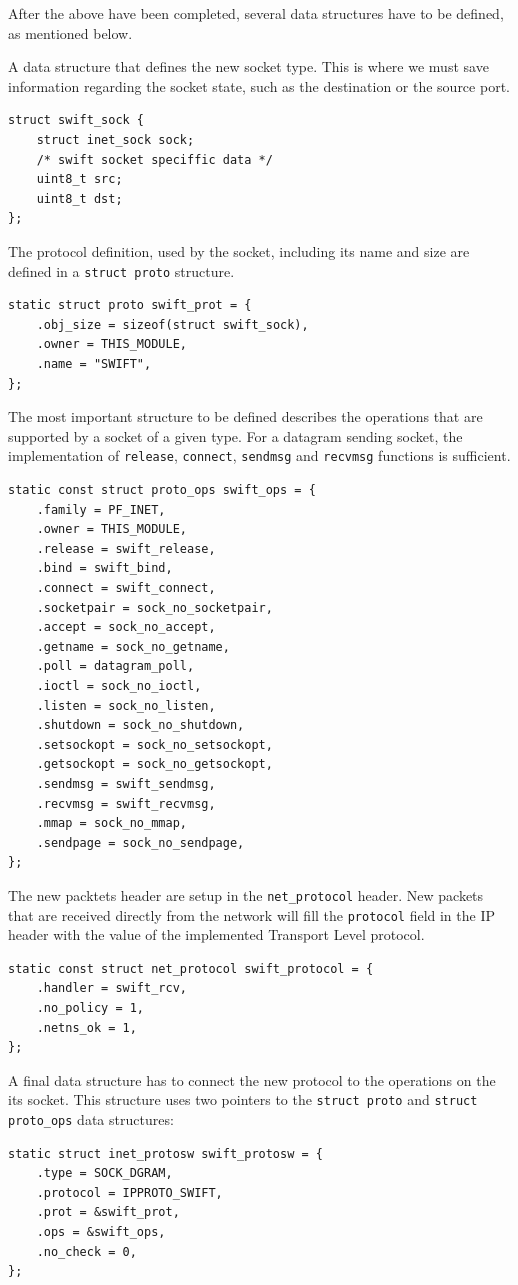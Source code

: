 After the above have been completed, several data structures have to be
defined, as mentioned below.

A data structure that defines the new socket type. This is where we must save
information regarding the socket state, such as the destination or the source
port.
\begin{verbatim}
struct swift_sock {
    struct inet_sock sock;
    /* swift socket speciffic data */
    uint8_t src;
    uint8_t dst;
};
\end{verbatim}

The protocol definition, used by the socket, including its name and size are
defined in a \texttt{struct proto} structure.
\begin{verbatim}
static struct proto swift_prot = {
    .obj_size = sizeof(struct swift_sock),
    .owner = THIS_MODULE,
    .name = "SWIFT",
};
\end{verbatim}

The most important structure to be defined describes the operations that are
supported by a socket of a given type. For a datagram sending socket, the
implementation of \texttt{release}, \texttt{connect}, \texttt{sendmsg} and
\texttt{recvmsg} functions is sufficient.
\begin{verbatim}
static const struct proto_ops swift_ops = {
    .family = PF_INET,
    .owner = THIS_MODULE,
    .release = swift_release,
    .bind = swift_bind,
    .connect = swift_connect,
    .socketpair = sock_no_socketpair,
    .accept = sock_no_accept,
    .getname = sock_no_getname,
    .poll = datagram_poll,
    .ioctl = sock_no_ioctl,
    .listen = sock_no_listen,
    .shutdown = sock_no_shutdown,
    .setsockopt = sock_no_setsockopt,
    .getsockopt = sock_no_getsockopt,
    .sendmsg = swift_sendmsg,
    .recvmsg = swift_recvmsg,
    .mmap = sock_no_mmap,
    .sendpage = sock_no_sendpage,
};
\end{verbatim}

The new packtets header are setup in the \texttt{net\_protocol} header. New
packets that are received directly from the network will fill the
\texttt{protocol} field in the IP header with the value of the implemented
Transport Level protocol.
\begin{verbatim}
static const struct net_protocol swift_protocol = {
    .handler = swift_rcv,
    .no_policy = 1,
    .netns_ok = 1,
};
\end{verbatim}

A final data structure has to connect the new protocol to the operations on
the its socket. This structure uses two pointers to the \texttt{struct proto}
and \texttt{struct proto\_ops} data structures:
\begin{verbatim}
static struct inet_protosw swift_protosw = {
    .type = SOCK_DGRAM,
    .protocol = IPPROTO_SWIFT,
    .prot = &swift_prot,
    .ops = &swift_ops,
    .no_check = 0,
};
\end{verbatim}

